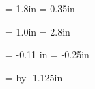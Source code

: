 

%
%
%
%
%
%




\pagestyle{empty}

\newcount\nrows\newcount\ncols
{}		%

\newdimen\vcorner \newdimen\hcorner 
\newdimen\vlabel \newdimen\hlabel

\vcorner = 1.8in	%
\hcorner = 0.35in	%

\vlabel  = 1.0in	%
\hlabel  = 2.8in	%

\newdimen \vfudge \newdimen \hfudge
\vfudge = -0.11 in 	%
\hfudge = -0.25in


\newdimen \tempp
\tempp = \hcorner 
\advance\tempp by -1.125in
\setlength{\oddsidemargin}{\tempp} %
\setlength{\evensidemargin}{\oddsidemargin}

